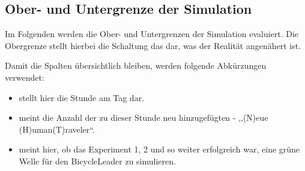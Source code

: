 %

\subsection{Ober- und Untergrenze der Simulation}\label{subsec:lower-upper-bound}

Im Folgenden werden die Ober- und Untergrenzen der Simulation evaluiert.
Die Obergrenze stellt hierbei die Schaltung  das dar, was der Realität angenähert ist.

Damit die Spalten übersichtlich bleiben, werden folgende Abkürzungen verwendet:
\begin{itemize}
    \item {} stellt hier die Stunde am Tag dar.
    \item {} meint die Anzahl der zu dieser Stunde neu hinzugefügten  - ,,(N)eue (H)uman(T)raveler``.
    \item {} meint hier, ob das Experiment 1, 2 und so weiter erfolgreich war, eine grüne Welle für den BicycleLeader zu simulieren.
\end{itemize}

